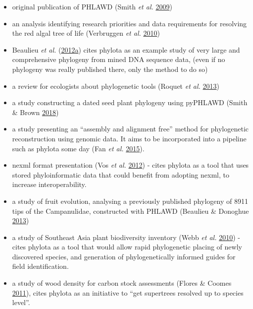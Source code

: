 \documentclass[]{article}
\providecommand{\tightlist}{%
  \setlength{\itemsep}{0pt}\setlength{\parskip}{0pt}}
\begin{document}
\begin{enumerate}
  \begin{itemize}
  \tightlist
  \item
    original publication of PHLAWD (Smith \emph{et al.} \protect\hyperlink{ref-smith2009mega}{2009})
  \item
    an analysis identifying research priorities and data requirements for resolving
    the red algal tree of life (Verbruggen \emph{et al.} \protect\hyperlink{ref-verbruggen2010data}{2010})
  \item
    Beaulieu \emph{et al.} (\protect\hyperlink{ref-beaulieu2012modeling}{2012}\protect\hyperlink{ref-beaulieu2012modeling}{a}) cites phylota as an example study of very large and comprehensive
    phylogeny from mined DNA sequence data, (even if no phylogeny was really published
    there, only the method to do so)
  \item
    a review for ecologists about phylogenetic tools (Roquet \emph{et al.} \protect\hyperlink{ref-roquet2013building}{2013})
  \item
    a study constructing a dated seed plant phylogeny using pyPHLAWD (Smith \& Brown \protect\hyperlink{ref-smith2018constructing}{2018})
  \item
    a study presenting an ``assembly and alignment free'' method for phylogenetic reconstruction
    using genomic data. It aims to be incorporated into a pipeline such as phylota some day (Fan \emph{et al.} \protect\hyperlink{ref-fan2015assembly}{2015}).
  \item
    nexml format presentation (Vos \emph{et al.} \protect\hyperlink{ref-vos2012nexml}{2012}) - cites phylota as a tool that uses
    stored phyloinformatic data that could benefit from adopting nexml, to increase
    interoperability.
  \item
    a study of fruit evolution, analysing a previously published phylogeny of 8911
    tips of the Campanulidae, constructed with PHLAWD (Beaulieu \& Donoghue \protect\hyperlink{ref-beaulieu2013fruit}{2013})
  \item
    a study of Southeast Asia plant biodiversity inventory (Webb \emph{et al.} \protect\hyperlink{ref-webb2010biodiversity}{2010}) -
    cites phylota as a tool that would allow rapid phylogenetic placing of newly
    discovered species, and generation of phylogenetically informed guides for field
    identification.
  \item
    a study of wood density for carbon stock assessments (Flores \& Coomes \protect\hyperlink{ref-flores2011estimating}{2011}),
    cites phylota as an initiative to ``get supertrees resolved up to species level''.

\end{itemize}
\end{enumerate}
\end{document}
